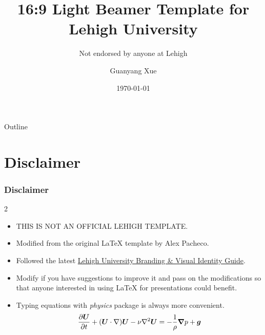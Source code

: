 \documentclass[11pt,t,aspectratio=169]{beamer}
\title{16:9 Light Beamer Template for Lehigh University}
\subtitle{Not endorsed by anyone at Lehigh}
\author{Guanyang Xue}
\institute{Lehigh University}
\date{\today}
\begin{document}
\begin{frame}
    \titlepage
\end{frame}

\begin{frame}[c]{Outline}
    \tableofcontents
\end{frame}

\section{Disclaimer}
\begin{frame}[c]
\frametitle{Disclaimer}
    \begin{multicols}{2}
    \begin{itemize}
        \item THIS IS NOT AN OFFICIAL LEHIGH TEMPLATE.
        \item Modified from the original \LaTeX{} template by Alex Pacheco.
        \item Followed the latest \href{https://www.lehigh.edu/~inis/sdownloads/Lehigh-Brand-Visual-Guide.pdf}{Lehigh University Branding \& Visual Identity Guide}.
        \item Modify if you have suggestions to improve it and pass on the modifications so that anyone interested in using \LaTeX{} for presentations could benefit.
        \end{itemize}
    \end{multicols}
    \begin{itemize}
        \item Typing equations with \emph{physics} package is always more convenient.
        $$\pdv{\vb*{U}}{t}+(\vb*{U}\cdot\nabla)\vb*{U}-\nu\laplacian\vb*{U} =-\frac{1}{\rho }\grad p+\vb*{g}$$
    \end{itemize}
\end{frame}
\end{document}
